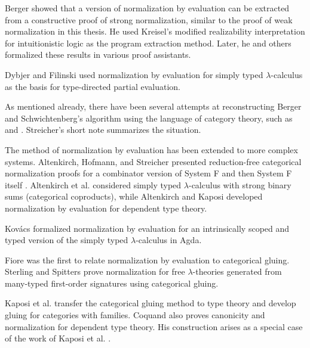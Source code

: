 Berger \cite{berger:1993:tlca} showed that a version of normalization by evaluation can be extracted from a constructive proof of strong normalization, similar to the proof of weak normalization in this thesis. He used Kreisel's modified realizability interpretation for intuitionistic logic as the program extraction method. Later, he and others \cite{berger:2006:sl} formalized these results in various proof assistants.

Dybjer and Filinski \cite{dybjer:2002:appsem} used normalization by evaluation for simply typed $\lambda$-calculus as the basis for type-directed partial evaluation.

As mentioned already, there have been several attempts at reconstructing Berger and Schwichtenberg's algorithm using the language of category theory, such as \cite{altenkirch:1995:ctcs} and \cite{cubric:1998:mscs}. Streicher's short note \cite{streicher:1998:appsem} summarizes the situation.

The method of normalization by evaluation has been extended to more complex systems. Altenkirch, Hofmann, and Streicher presented reduction-free categorical normalization proofs for a combinator version of System F \cite{altenkirch1996reduction} and then System F itself \cite{altenkirch1996systemf}. Altenkirch et al. \cite{DBLP:conf/lics/AltenkirchDHS01} considered simply typed $\lambda$-calculus with strong binary sums (categorical coproducts), while Altenkirch and Kaposi \cite{DBLP:conf/rta/AltenkirchK16} developed normalization by evaluation for dependent type theory. 

Kovács \cite{kovacs:2017:msc} formalized normalization by evaluation for an intrinsically scoped and typed version of the simply typed $\lambda$-calculus in Agda.

Fiore \cite{fiore:2002:ppdp} was the first to relate normalization by evaluation to categorical gluing. Sterling and Spitters \cite{sterling:2018:arxiv} prove normalization for free $\lambda$-theories generated from many-typed first-order signatures using categorical gluing.

Kaposi et al. \cite{DBLP:conf/rta/KaposiHS19} transfer the categorical gluing method to type theory and develop gluing for categories with families. Coquand \cite{DBLP:journals/tcs/Coquand19} also proves canonicity and normalization for dependent type theory. His construction arises as a special case of the work of Kaposi et al. \cite{DBLP:conf/rta/KaposiHS19}.


